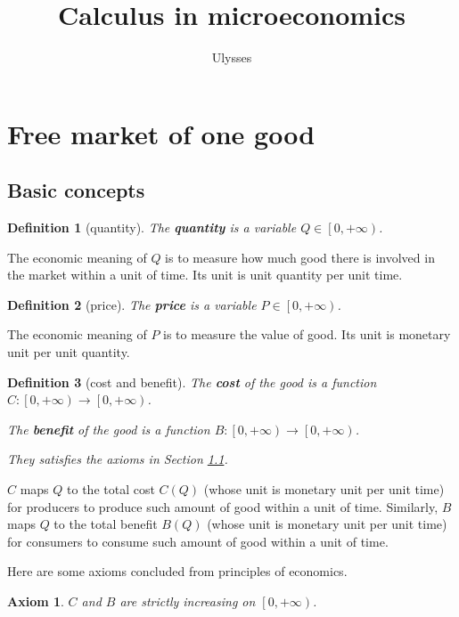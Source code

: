 \documentclass{article}
\title{Calculus in microeconomics}
\author{Ulysses}
\newtheorem{axiom}{Axiom}[subsection]
\newtheorem{definition}{Definition}[subsection]
\begin{document}
\maketitle

\tableofcontents

\section{Free market of one good}

\subsection{Basic concepts}
\label{basic}

\begin{definition}[quantity]
The \textbf{quantity} is a variable $Q\in\left[0,+\infty\right)$.
\end{definition}

The economic meaning of $Q$ is to measure how much good there is involved in the market within a unit of time.
Its unit is unit quantity per unit time.

\begin{definition}[price]
The \textbf{price} is a variable $P\in\left[0,+\infty\right)$.
\end{definition}

The economic meaning of $P$ is to measure the value of good.
Its unit is monetary unit per unit quantity.

\begin{definition}[cost and benefit]
The \textbf{cost} of the good is a function $C:\left[0,+\infty\right)\to\left[0,+\infty\right)$.

The \textbf{benefit} of the good is a function $B:\left[0,+\infty\right)\to\left[0,+\infty\right)$.

They satisfies the axioms in Section \ref{basic}.
\end{definition}

$C$ maps $Q$ to the total cost $C\!\left(Q\right)$ (whose unit is monetary unit per unit time) for producers to produce such amount of good within a unit of time.
Similarly, $B$ maps $Q$ to the total benefit $B\!\left(Q\right)$ (whose unit is monetary unit per unit time) for consumers to consume such amount of good within a unit of time.

Here are some axioms concluded from principles of economics.

\begin{axiom}
\label{monoticity}
$C$ and $B$ are strictly increasing on $\left[0,+\infty\right)$.
\end{axiom}
\end{document}
